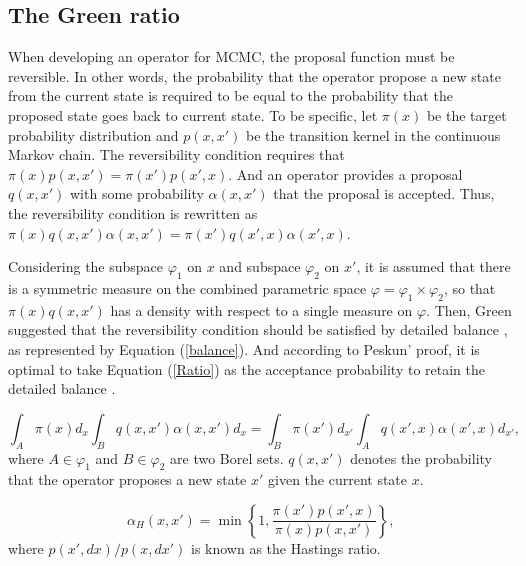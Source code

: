\documentclass{bmcart}
\begin{document}
\begin{backmatter}
\subsection*{The Green ratio}
When developing an operator for MCMC, the proposal function must be reversible. In other words, the probability that the operator propose a new state from the current state is required to be equal to the probability that the proposed state goes back to current state. To be specific, let ${\pi (x)}$ be the target probability distribution and $p(x, x')$ be the transition kernel in the continuous Markov chain. The reversibility condition requires that ${\pi (x)}{p(x, x')} = {\pi (x')}{p(x', x)}$. And an operator provides a proposal $q(x, x')$ with some probability $\alpha(x, x')$ that the proposal is accepted. Thus, the reversibility condition is rewritten as ${\pi (x)}{q(x, x')}{\alpha(x, x')} = {\pi (x')}{q(x', x)}{\alpha(x', x)}$.

Considering the subspace $\varphi_1$ on $x$ and subspace $\varphi_2$ on $x'$, it is assumed that there is a symmetric measure on the combined parametric space $\varphi = {\varphi_1} \times {\varphi_2}$, so that ${\pi (x)}{q(x, x')}$ has a density with respect to a single measure on $\varphi$. Then, Green suggested that the reversibility condition should be satisfied by detailed balance \cite{green1995reversible}, as represented by Equation (\ref{balance}). And according to Peskun' proof, it is optimal to take Equation (\ref{Ratio}) as the acceptance probability to retain the detailed balance \cite{peskun1973optimum}.

\begin{equation}\label{balance}
\int_A {\pi (x) d_x} {\int_B  {q(x, x')}{\alpha(x, x')} d_x}  = \int_B {\pi (x') d_{x'}}{\int_A {q(x', x)}{\alpha(x', x)} d_{x'}} \text{,}
\end{equation}
where $A \in {\varphi_1}$ and $B \in  {\varphi_2}$ are two Borel sets. ${q(x, x')}$ denotes the probability that the operator proposes a new state $x'$ given the current state $x$.

\begin{equation}\label{Ratio}
{\alpha_H}(x, x') = \min \left\{ {1,\frac{{\pi (x'){p}(x',x)}}{{\pi (x){p}(x,x')}}} \right\} \text{,}
\end{equation}
where ${p(x',dx)}/{p(x,dx')}$ is known as the Hastings ratio.


\end{backmatter}
\end{document}

